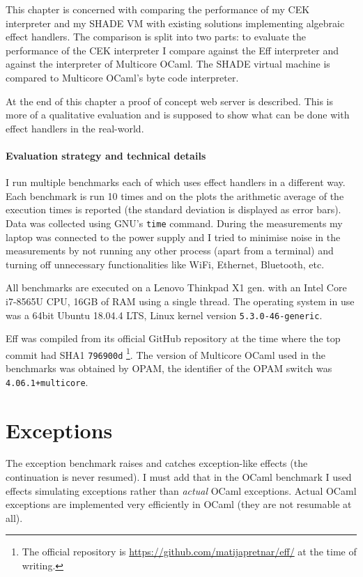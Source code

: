 \documentclass[class=article, crop=false]{standalone}
\begin{document}
This chapter is concerned with comparing the performance of my CEK interpreter
and my SHADE VM with existing solutions implementing algebraic effect handlers.
The comparison is split into two parts: to evaluate the performance of the
CEK interpreter I compare against the Eff interpreter and against the interpreter
of Multicore OCaml. The SHADE virtual machine is compared to Multicore OCaml's
byte code interpreter.

At the end of this chapter a proof of concept web server is described. This is
more of a qualitative evaluation and is supposed to show what can be done 
with effect handlers in the real-world.

\paragraph{Evaluation strategy and technical details}

I run multiple benchmarks each of which uses effect handlers in a different
way. Each benchmark is run 10 times and on the plots the arithmetic average of
the execution times is reported (the standard deviation is displayed as error
bars). Data was collected using GNU's \verb|time| command. During the measurements
my laptop was connected to the power supply and I tried to minimise noise in the measurements
by not running any other process (apart from a terminal) and turning off
unnecessary functionalities like WiFi, Ethernet, Bluetooth, etc.

All benchmarks are executed on a Lenovo Thinkpad X1  gen. with an Intel
Core i7-8565U CPU, 16GB of RAM using a single thread. The operating system in
use was a 64bit Ubuntu 18.04.4 LTS, Linux kernel version \verb|5.3.0-46-generic|.

Eff was compiled from its official GitHub repository at the time where the top
commit had SHA1 \verb|796900d|%
\footnote{The official repository is
\url{https://github.com/matijapretnar/eff/} at the time of writing.}.
The version of Multicore OCaml used in the benchmarks was obtained by OPAM, the
identifier of the OPAM switch was \verb|4.06.1+multicore|.

\section{Exceptions}

The exception benchmark raises and catches exception-like effects (the
continuation is never resumed). I must add that in the OCaml benchmark I used
effects simulating exceptions rather than \emph{actual} OCaml exceptions. Actual
OCaml exceptions are implemented very efficiently in OCaml (they are not
resumable at all).
\end{document}

